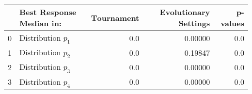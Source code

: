 \begin{tabular}{llrrr}
\toprule
{} & Best Response Median in: &  Τournament &  Evolutionary Settings &  p-values \\
\midrule
0 &       Distribution $p_1$ &         0.0 &                0.00000 &       0.0 \\
1 &       Distribution $p_2$ &         0.0 &                0.19847 &       0.0 \\
2 &       Distribution $p_3$ &         0.0 &                0.00000 &       0.0 \\
3 &       Distribution $p_4$ &         0.0 &                0.00000 &       0.0 \\
\bottomrule
\end{tabular}
